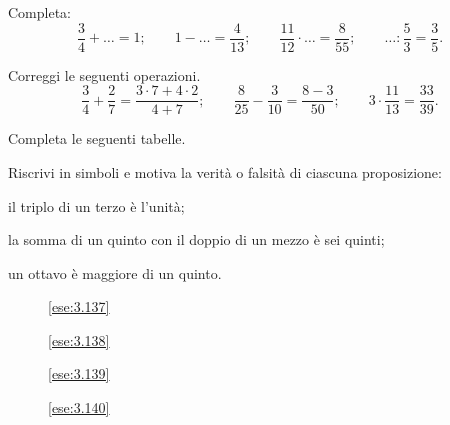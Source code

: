 \begin{esercizio}
Completa:
\[\frac{3}{4}+\ldots=1;\qquad1-\ldots=\frac{4}{13};\qquad\frac{11}{12}\cdot
\ldots=\frac{8}{55};%
\qquad\ldots:\frac{5}{3}=\frac{3}{5}.\]
\end{esercizio}

\begin{esercizio}
Correggi le seguenti operazioni.
\[\frac{3}{4}+\frac{2}{7}=\frac{3\cdot7+4\cdot2}{4+7};\qquad%
\frac{8}{25}-\frac{3}{10}=\frac{8-3}{50};\qquad%
3\cdot\frac{11}{13}=\frac{33}{39}.\]
\end{esercizio}

\begin{esercizio}
Completa le seguenti tabelle.

\begin{minipage}{.45\textwidth}
 \begin{center}
 
\end{center}
\end{minipage}
\begin{minipage}{.45\textwidth}
 \begin{center}
 
\end{center}
\end{minipage}
\end{esercizio}

\begin{esercizio}
Riscrivi in simboli e motiva la verità o falsità di ciascuna proposizione:
\begin{enumeratea}
\item il triplo di un terzo è l'unità;
\item la somma di un quinto con il doppio di un mezzo è sei quinti;
\item un ottavo è maggiore di un quinto.
\end{enumeratea}
\end{esercizio}

\begin{inaccessibleblock}
 \begin{figure}[t]
 \begin{minipage}[b]{.20\textwidth}
 \centering
 \caption{\ref{ese:3.137}}\label{fig:3.6}
 \end{minipage}\hfil
 \begin{minipage}[b]{.20\textwidth}
 \centering 
 \caption{\ref{ese:3.138}}\label{fig:3.7}
 \end{minipage}\hfil
 \begin{minipage}[b]{.20\textwidth}
 \centering
 \caption{\ref{ese:3.139}}\label{fig:3.8}
 \end{minipage}\hfil
 \begin{minipage}[b]{.23\textwidth}
 \centering
 \caption{\ref{ese:3.140}}\label{fig:3.9}
 \end{minipage}\hfil
\end{figure}
\end{inaccessibleblock}

